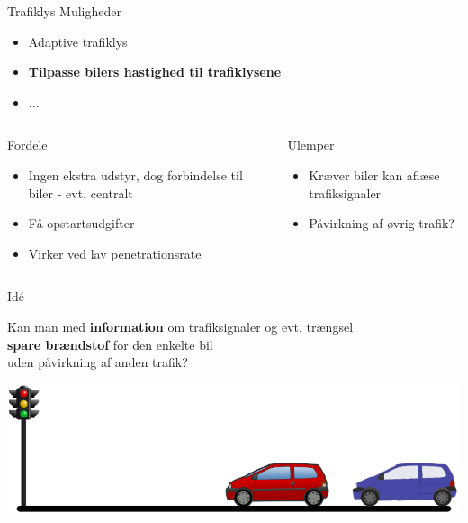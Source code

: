 \begin{frame}{Trafiklys}
Muligheder
\begin{itemize}
\item Adaptive trafiklys
\item \textbf{Tilpasse bilers hastighed til trafiklysene}
\item ...
\end{itemize}


\begin{center}
\begin{columns}
\begin{column}{0.5\textwidth}
Fordele
\begin{itemize}
\item Ingen ekstra udstyr, dog forbindelse til biler - evt. centralt
\item Få opstartsudgifter 
\item Virker ved lav penetrationsrate
\end{itemize}
\end{column}

\begin{column}{0.5\textwidth}
Ulemper
\begin{itemize}
\item Kræver biler kan aflæse trafiksignaler
\item Påvirkning af øvrig trafik?
\end{itemize}
\vspace{1.2cm}
\end{column}
\end{columns}
\end{center}
\end{frame}

\begin{frame}{Idé}
\begin{center}
Kan man med \textbf{information} om trafiksignaler og evt. trængsel\\\textbf{spare brændstof} for den enkelte bil\\uden påvirkning af anden trafik?
\end{center}
\includegraphics[width=1\textwidth]{images/figure.png}
\end{frame}


